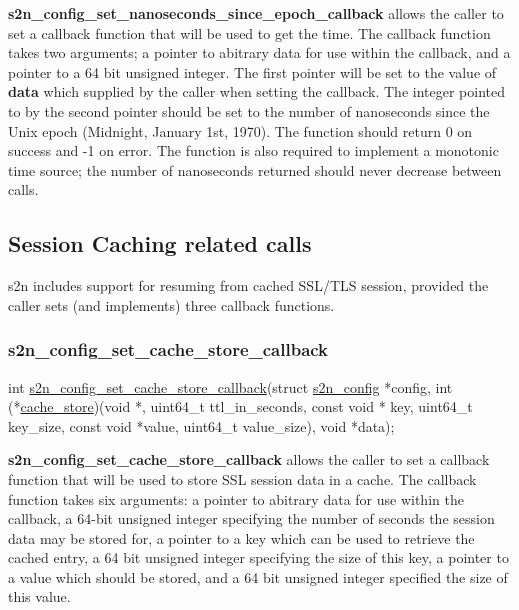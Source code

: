 {\bfseries s2n\+\_\+config\+\_\+set\+\_\+nanoseconds\+\_\+since\+\_\+epoch\+\_\+callback} allows the caller to set a callback function that will be used to get the time. The callback function takes two arguments; a pointer to abitrary data for use within the callback, and a pointer to a 64 bit unsigned integer. The first pointer will be set to the value of {\bfseries data} which supplied by the caller when setting the callback. The integer pointed to by the second pointer should be set to the number of nanoseconds since the Unix epoch (Midnight, January 1st, 1970). The function should return 0 on success and -\/1 on error. The function is also required to implement a monotonic time source; the number of nanoseconds returned should never decrease between calls.

\subsection*{Session Caching related calls}

s2n includes support for resuming from cached S\+S\+L/\+T\+LS session, provided the caller sets (and implements) three callback functions.

\subsubsection*{s2n\+\_\+config\+\_\+set\+\_\+cache\+\_\+store\+\_\+callback}


\begin{DoxyCode}
\textcolor{keywordtype}{int} \hyperlink{s2n_8h_a2b4ec043b39d8a0e3f4f5113e941c338}{s2n\_config\_set\_cache\_store\_callback}(\textcolor{keyword}{struct} 
      \hyperlink{structs2n__config}{s2n\_config} *config, \textcolor{keywordtype}{int} (*\hyperlink{s2nd_8c_a9415451f8ae94353430b3e0890ad6196}{cache\_store})(\textcolor{keywordtype}{void} *, uint64\_t ttl\_in\_seconds, \textcolor{keyword}{const} \textcolor{keywordtype}{void} *
      key, uint64\_t key\_size, \textcolor{keyword}{const} \textcolor{keywordtype}{void} *value, uint64\_t value\_size), \textcolor{keywordtype}{void} *data);
\end{DoxyCode}


{\bfseries s2n\+\_\+config\+\_\+set\+\_\+cache\+\_\+store\+\_\+callback} allows the caller to set a callback function that will be used to store S\+SL session data in a cache. The callback function takes six arguments\+: a pointer to abitrary data for use within the callback, a 64-\/bit unsigned integer specifying the number of seconds the session data may be stored for, a pointer to a key which can be used to retrieve the cached entry, a 64 bit unsigned integer specifying the size of this key, a pointer to a value which should be stored, and a 64 bit unsigned integer specified the size of this value.

